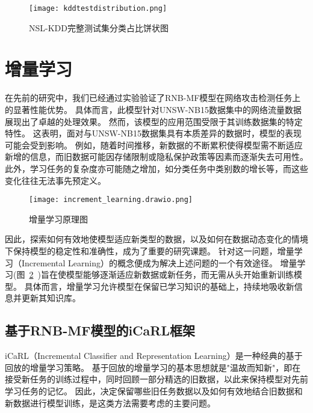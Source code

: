   \begin{figure}[htbp]
    \centering
    \texttt{[image: kddtestdistribution.png]}
    \caption{NSL-KDD完整测试集分类占比饼状图}
    \label{fig:kddtestdistribution}
  \end{figure}


\section{增量学习}
在先前的研究中，我们已经通过实验验证了RNB-MF模型在网络攻击检测任务上的显著性能优势。
具体而言，此模型针对UNSW-NB15数据集中的网络流量数据展现出了卓越的处理效果。
然而，该模型的应用范围受限于其训练数据集的特定特性。
这表明，面对与UNSW-NB15数据集具有本质差异的数据时，模型的表现可能会受到影响。
例如，随着时间推移，新数据的不断累积使得模型需不断适应新增的信息，而旧数据可能因存储限制或隐私保护政策等因素而逐渐失去可用性。
此外，学习任务的复杂度亦可能随之增加，如分类任务中类别数的增长等，而这些变化往往无法事先预定义。\par


\begin{figure}[htbp]
  \centering
  \texttt{[image: increment\_learning.drawio.png]}
  \caption{增量学习原理图}
  \label{fig:incremental_learning}
\end{figure}
因此，探索如何有效地使模型适应新类型的数据，以及如何在数据动态变化的情境下保持模型的稳定性和准确性，成为了重要的研究课题。
针对这一问题，增量学习（Incremental Learning）的概念便成为解决上述问题的一个有效途径。
增量学习(图~\ref{fig:incremental_learning}~)旨在使模型能够逐渐适应新数据或新任务，而无需从头开始重新训练模型。
具体而言，增量学习允许模型在保留已学习知识的基础上，持续地吸收新信息并更新其知识库。

\subsection{基于RNB-MF模型的iCaRL框架}
iCaRL（Incremental Classifier and Representation Learning）\cite{rebuffi2017icarl}是一种经典的基于回放的增量学习策略。
基于回放的增量学习的基本思想就是"温故而知新"，即在接受新任务的训练过程中，同时回顾一部分精选的旧数据，以此来保持模型对先前学习任务的记忆。
因此，决定保留哪些旧任务数据以及如何有效地结合旧数据和新数据进行模型训练，是这类方法需要考虑的主要问题。\par


